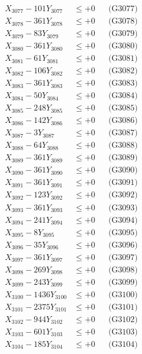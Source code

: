 \documentclass[a4paper,10pt]{article}
\begin{document}
{\begin{align}
X_{3077} - 101Y_{3077} &\leq +0 && \text{(G3077)} \\
X_{3078} - 361Y_{3078} &\leq +0 && \text{(G3078)} \\
X_{3079} - 83Y_{3079} &\leq +0 && \text{(G3079)} \\
X_{3080} - 361Y_{3080} &\leq +0 && \text{(G3080)} \\
\allowbreak
X_{3081} - 61Y_{3081} &\leq +0 && \text{(G3081)} \\
X_{3082} - 106Y_{3082} &\leq +0 && \text{(G3082)} \\
X_{3083} - 361Y_{3083} &\leq +0 && \text{(G3083)} \\
X_{3084} - 50Y_{3084} &\leq +0 && \text{(G3084)} \\
X_{3085} - 248Y_{3085} &\leq +0 && \text{(G3085)} \\
X_{3086} - 142Y_{3086} &\leq +0 && \text{(G3086)} \\
X_{3087} - 3Y_{3087} &\leq +0 && \text{(G3087)} \\
X_{3088} - 64Y_{3088} &\leq +0 && \text{(G3088)} \\
X_{3089} - 361Y_{3089} &\leq +0 && \text{(G3089)} \\
X_{3090} - 361Y_{3090} &\leq +0 && \text{(G3090)} \\
\allowbreak
X_{3091} - 361Y_{3091} &\leq +0 && \text{(G3091)} \\
X_{3092} - 123Y_{3092} &\leq +0 && \text{(G3092)} \\
X_{3093} - 361Y_{3093} &\leq +0 && \text{(G3093)} \\
X_{3094} - 241Y_{3094} &\leq +0 && \text{(G3094)} \\
X_{3095} - 8Y_{3095} &\leq +0 && \text{(G3095)} \\
X_{3096} - 35Y_{3096} &\leq +0 && \text{(G3096)} \\
X_{3097} - 361Y_{3097} &\leq +0 && \text{(G3097)} \\
X_{3098} - 269Y_{3098} &\leq +0 && \text{(G3098)} \\
X_{3099} - 243Y_{3099} &\leq +0 && \text{(G3099)} \\
X_{3100} - 1436Y_{3100} &\leq +0 && \text{(G3100)} \\
\allowbreak
X_{3101} - 2375Y_{3101} &\leq +0 && \text{(G3101)} \\
X_{3102} - 944Y_{3102} &\leq +0 && \text{(G3102)} \\
X_{3103} - 601Y_{3103} &\leq +0 && \text{(G3103)} \\
X_{3104} - 185Y_{3104} &\leq +0 && \text{(G3104)} \\

\end{align}}
\end{document}
